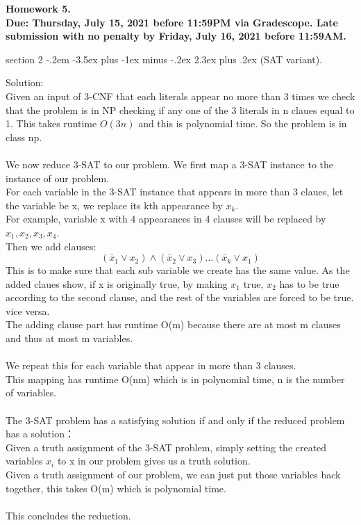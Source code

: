 \documentclass{article}
\makeatletter
\newenvironment{problem}{\@startsection
       {section}
       {2}
       {-.2em}
       {-3.5ex plus -1ex minus -.2ex}
       {2.3ex plus .2ex}
       {\pagebreak[3]%
       \large\bf\noindent{Problem }
       }
       }
\makeatother
\begin{document}
{\bf \noindent Homework 5. \\ Due: Thursday, July 15, 2021 before 11:59PM via Gradescope. Late submission with no penalty by Friday, July 16, 2021 before 11:59AM.}

\begin{problem}{(SAT variant).}
 
Solution:\\
Given an input of 3-CNF that each literals appear no more than 3 times
we check that the problem is in NP checking if any one of the 3 literals in
n claues equal to 1. This takes runtime \(O(3n)\) and this is polynomial time.
So the problem is in class np.\\
\\
We now reduce 3-SAT to our problem. We first map a 3-SAT instance to the instance of our problem.\\
For each variable in the 3-SAT instance that appears in more than 3 claues, let the variable be x, we replace its kth appearance by \(x_k\).\\
For example, variable x with 4 appearances in 4 clauses will be replaced by \(x_1,x_2,x_3,x_4\).\\
Then we add clauses:\\
\[(\bar{x}_1 \vee x_2)\wedge(\bar{x}_2 \vee x_3)...(\bar{x}_k \vee x_1)\]
This is to make sure that each sub variable we create has the same value. As the added claues show, if x is originally true, by making \(x_1\) true, \(x_2\) has to be true according to the second clause, and the rest of the variables are forced to be true. vice versa.\\
The adding clause part has runtime O(m) because there are at most m clauses and thus at most m variables.\\
\\
We repeat this for each variable that appear in more than 3 clauses.\\
This mapping has runtime O(nm) which is in polynomial time, n is the number of variables.\\
\\
The 3-SAT problem has a satisfying solution if and only if the reduced problem has a solution：\\
Given a truth assignment of the 3-SAT problem, simply setting the created variables \(x_i\) to x in our problem gives us a truth solution.\\
Given a truth assignment of our problem, we can just put those variables back together, this takes O(m) which is polynomial time.\\
\\
This concludes the reduction.\\

\end{problem}
\end{document}
